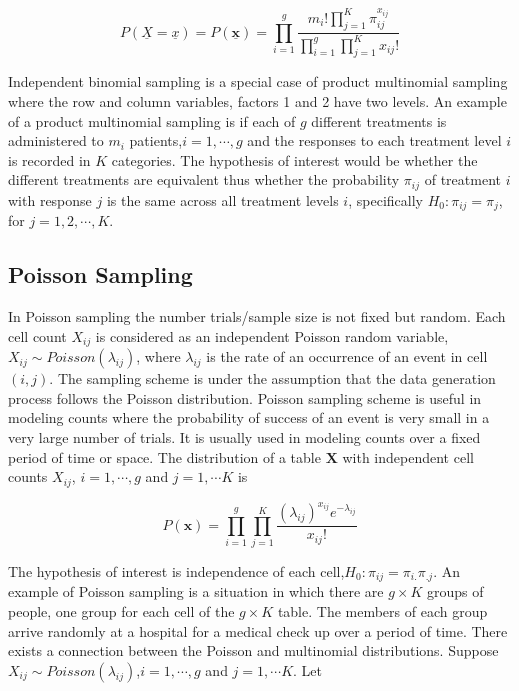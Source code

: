 \documentclass[12pt,oneside]{report}
\theoremstyle{definition}
\theoremstyle{mystyle}
\begin{document}
\begin{equation}
P(\underline{X}=\underline{x})=P(\underline{\textbf{x}})=\displaystyle \prod\limits _{i=1}^{g}\frac{m_{i}!\prod\limits _{j=1}^{K}\pi_{ij}^{x_{ij}}}{\prod\limits _{i=1}^{g}\prod\limits _{j=1}^{K}x_{ij}!}
\end{equation}


\vspace{5mm}
Independent binomial sampling is a special case of product multinomial sampling where the row and column variables, factors 1 and 2 have two levels.  An example of a product multinomial sampling is if  each of  $g$ different treatments is administered to $m_{i}$ patients,$i=1,\cdots,g$ and the responses to each treatment level $i$ is recorded in $K$ categories. The hypothesis of interest would be whether the different treatments are equivalent thus whether the probability $\pi_{ij}$ of treatment $i$ with response $j$ is the same across all treatment levels $i$, specifically $H_{0}:\pi_{ij}=\pi_{j}$, for $j=1,2,\cdots,K$.
\subsection{Poisson Sampling}
In Poisson sampling the number trials/sample size is not fixed but random. Each cell count $X_{ij}$ is considered as an independent Poisson random variable, $X_{ij}\sim Poisson(\lambda_{ij})$, where $\lambda_{ij}$ is the rate of an occurrence of an event in  cell $(i,j)$. The sampling scheme is under the assumption that the data  generation process follows the Poisson distribution. Poisson sampling scheme is useful in modeling counts where the probability of  success of an event is very small in a very large number of trials. It is usually used in modeling counts over a fixed period of time or space. The distribution of a table $\textbf{X}$  with  independent cell counts $X_{ij}$,  $i=1,\cdots,g$ and $j=1,\cdots K$ is

\begin{equation}
P(\textbf{x})=\displaystyle \prod\limits _{i=1}^{g}\prod\limits _{j=1}^{K}\frac{(\lambda_{ij})^{x_{ij}}e^{-\lambda_{ij}}}{x_{ij}!}
\end{equation}

\vspace{5mm}
The hypothesis of interest is independence of each cell,$H_{0}:\pi_{ij}=\pi_{i.}\pi_{.j}$. An example of Poisson sampling is a situation in which there are  $g\times K$ groups of people, one group  for each cell of the $g\times K$ table. The members of each group arrive randomly at a hospital for a medical check up over a period of time. There exists a connection between the  Poisson and multinomial distributions. Suppose $X_{ij}\sim Poisson(\lambda_{ij})$,$i=1,\cdots,g$ and $j=1,\cdots K$. Let 
\end{document}
